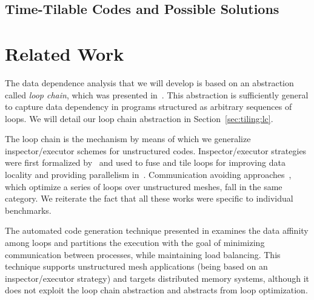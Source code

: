 \subsection{Time-Tilable Codes and Possible Solutions}
%
%
%
%
%
%
%
%

\section{Related Work}
\label{sec:tiling:relatedwork}
The data dependence analysis that we will develop is based on an abstraction called \textit{loop chain}, which was presented in~\cite{KriegerHIPS2013}. This abstraction is sufficiently general to capture data dependency in programs structured as arbitrary sequences of loops. We will detail our loop chain abstraction in Section~\ref{sec:tiling:lc}.

The loop chain is the mechanism by means of which we generalize inspector/executor schemes for unstructured codes. Inspector/executor strategies were first formalized by~\cite{Saltz91} and used to fuse and tile loops for improving data locality and providing parallelism in~\cite{dimeEtna00,StroutLCPC2002,Demmel08,KriegerIAAA2012}. Communication avoiding approaches~\cite{commAvoidingSparse2009}, which optimize a series of loops over unstructured meshes, fall in the same category. We reiterate the fact that all these works were specific to individual benchmarks. 

The automated code generation technique presented in \cite{Ravishankar12} examines the data affinity among loops and partitions the execution with the goal of minimizing communication between processes, while maintaining load balancing. This technique supports unstructured mesh applications (being based on an inspector/executor strategy) and targets distributed memory systems, although it does not exploit the loop chain abstraction and abstracts from loop optimization.

